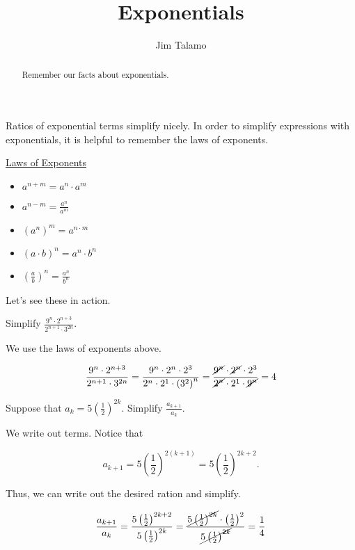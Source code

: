 \documentclass{ximera}
\title[Refresh:]{Exponentials}
\author{Jim Talamo}
\begin{document}
\begin{abstract}
  Remember our facts about exponentials.
\end{abstract}
\maketitle


\begin{exercise}
Ratios of exponential terms simplify nicely. In order to simplify expressions with exponentials, it is helpful to remember the laws of exponents.

\underline{Laws of Exponents}
\begin{itemize}
\item $a^{n+m} = a^n \cdot a^m$
\item $a^{n-m} = \frac{a^n}{a^m}$
\item $\left(a^n\right)^m = a^{n \cdot m}$
\item $(a \cdot b)^n = a^n \cdot b^n$
\item $\left(\frac{a}{b}\right)^n = \frac{a^n}{b^n}$
\end{itemize}

Let's see these in action.

\begin{example}
Simplify $\frac{9^n\cdot 2^{n+3}}{2^{n+1} \cdot 3^{2n}}$.

\begin{explanation}
We use the laws of exponents above.

\[
\frac{9^n\cdot 2^{n+3}}{2^{n+1} \cdot 3^{2n}} = \frac{9^n \cdot 2^n \cdot 2^3}{2^n \cdot 2^1 \cdot \left(3^2\right)^n}= \frac{\cancel{9^n} \cdot \cancel{2^n} \cdot 2^3}{\cancel{2^n} \cdot 2^1 \cdot \cancel{9^n} } =4
\]
\end{explanation}
\end{example}

\begin{example}
Suppose that $a_k = 5\left(\frac{1}{2}\right)^{2k}$.  Simplify $\frac{a_{k+1}}{a_k}$.

\begin{explanation}
We write out terms.  Notice that 

\[
a_{k+1} = 5\left(\frac{1}{2}\right)^{2(k+1)} = 5\left(\frac{1}{2}\right)^{2k+2}.
\]

Thus, we can write out the desired ration and simplify.

\[
\frac{a_{k+1}}{a_k} = \frac{5\left(\frac{1}{2}\right)^{2k+2}}{5\left(\frac{1}{2}\right)^{2k}}= \frac{\cancel{5\left(\frac{1}{2}\right)^{2k}}\cdot \left(\frac{1}{2}\right)^2}{\cancel{5\left(\frac{1}{2}\right)^{2k}}} = \frac{1}{4}
\]
\end{explanation}
\end{example}


\end{exercise}
\end{document}

